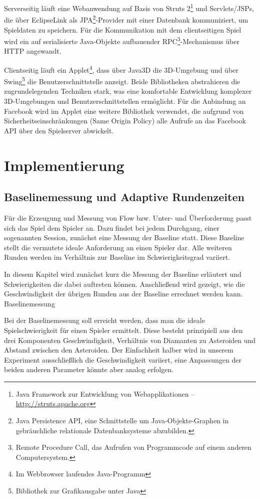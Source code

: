 \documentclass[a4paper,12pt]{scrartcl}
\begin{document}
Serverseitig läuft eine Webanwendung auf Basis von Struts 2\footnote{Java Framework zur Entwicklung von Webapplikationen -- \url{http://struts.apache.org}} und Servlets/JSPs, die
über EclipseLink als JPA\footnote{Java Persistence API, eine Schnittstelle um
Java-Objekte-Graphen in gebräuchliche relationale Datenbanksysteme
abzubilden.}-Provider mit einer Datenbank kommuniziert, um Spieldaten zu speichern. Für die Kommunikation mit dem clientseitigen Spiel wird ein auf serialisierte Java-Objekte aufbauender RPC\footnote{Remote Procedure Call, das Aufrufen von
Programmcode auf einem anderen Computersystem.}-Mechanismus über HTTP angewandt.

Clientseitig läuft ein Applet\footnote{Im Webbrowser laufendes Java-Programm}, dass über Java3D die 3D-Umgebung und über Swing\footnote{Bibliothek zur Grafikausgabe unter Java} die Benutzerschnittstelle anzeigt. Beide Bibliotheken abstrahieren die zugrundelegenden Techniken stark, was eine komfortable Entwicklung komplexer 3D-Umgebungen und Benutzerschnittstellen ermöglicht. Für die Anbindung an Facebook wird im Applet eine weitere Bibliothek verwendet, die aufgrund von Sicherheitseinschränkungen (Same Origin Policy) alle Aufrufe an das Facebook API über den Spielserver abwickelt.

\section{Implementierung}
\subsection{Baselinemessung und Adaptive Rundenzeiten}
Für die Erzeugung und Messung von Flow bzw. Unter- und Überforderung passt sich das
Spiel dem Spieler an. Dazu findet bei jedem Durchgang, einer sogenannten Session,
zunächst eine Messung der Baseline statt. Diese Baseline stellt die vermutete ideale
Anforderung an einen Spieler dar. Alle weiteren Runden werden im Verhältnis zur Baseline
im Schwierigkeitsgrad variiert.

In diesem Kapitel wird zunächst kurz die Messung der Baseline erläutert und
Schwierigkeiten die dabei auftreten können. Anschließend wird gezeigt, wie die
Geschwindigkeit der übrigen Runden aus der Baseline errechnet werden kann.
Baselinemessung

Bei der Baselinemessung soll erreicht werden, dass man die ideale Spielschwierigkeit für
einen Spieler ermittelt. Diese besteht prinzipiell aus den drei Komponenten Geschwindigkeit,
Verhältnis von Diamanten zu Asteroiden und Abstand zwischen den Asteroiden. Der
Einfachheit halber wird in unserem Experiment ausschließlich die Geschwindigkeit variiert,
eine Anpassungen der beiden anderen Parameter könnte aber analog erfolgen.
\end{document}
